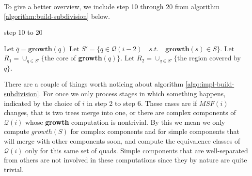 To give a better overview, we include step 10 through 20 from algorithm 
\ref{algorithm:build-subdivision} below.

\begin{algorithm}[H]
	\setcounter{algorithm}{7}
	\caption{step 10 to 20}  
	\begin{algorithmic}[1]
    	\setcounter{ALG@line}{9}
            \State Let $\bar{q} = \mathbf{growth}(q)$
                \State {}
            \EndIf
        \EndFor
            \State Let $S'=\{q\in\mathcal{Q}(i-2) \quad s.t. \quad 
            \mathbf{growth}(s)\in S\}$.
                \State Let $R_1 = \cup_{q\in S'} \{$the core of 
                \textbf{growth}$(q)\}.$
                \State Let $R_2 = \cup_{q\in S'} \{$the region covered by 
                $q\}.$
                \State {}
                \State {}
            \EndIf
        \EndFor
	\end{algorithmic} 
\end{algorithm}


There are a couple of things worth noticing about algorithm \ref{algo:impl-build-subdivision}. For once 
we only process stages in which something happens, indicated by the choice of $i$ in step 2 to step 6. 
These cases are if $MSF(i)$ changes, that is two trees merge into one, or there are complex components 
of $\mathcal{Q}(i)$ whose \textbf{growth} computation is nontrivial. By this we mean we only compute 
$growth(S)$ for complex components and for simple components that will merge with other components soon, 
and compute the equivalence classes of $\mathcal{Q}(i)$ only for this same set of quads. Simple 
components that are well-separated from others are not involved in these computations since they by 
nature are quite trivial. 

